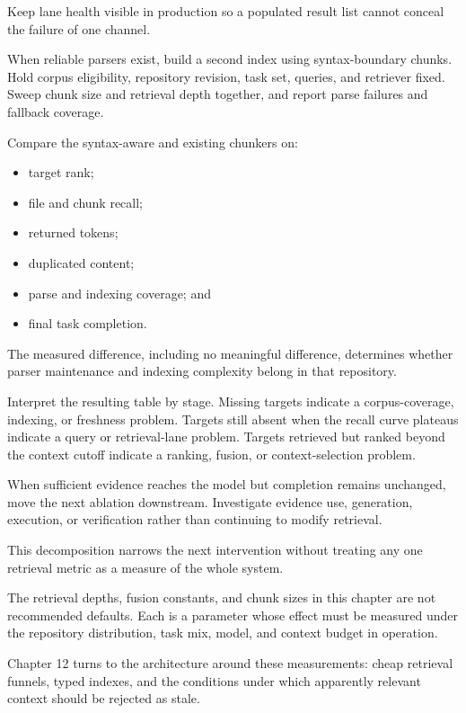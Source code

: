 Keep lane health visible in production so a populated result list cannot conceal the failure of one channel.

When reliable parsers exist, build a second index using syntax-boundary chunks. Hold corpus eligibility, repository revision, task set, queries, and retriever fixed. Sweep chunk size and retrieval depth together, and report parse failures and fallback coverage.

Compare the syntax-aware and existing chunkers on:

\begin{itemize}
\tightlist
\item
  target rank;
\item
  file and chunk recall;
\item
  returned tokens;
\item
  duplicated content;
\item
  parse and indexing coverage; and
\item
  final task completion.
\end{itemize}

The measured difference, including no meaningful difference, determines whether parser maintenance and indexing complexity belong in that repository.

Interpret the resulting table by stage. Missing targets indicate a corpus-coverage, indexing, or freshness problem. Targets still absent when the recall curve plateaus indicate a query or retrieval-lane problem. Targets retrieved but ranked beyond the context cutoff indicate a ranking, fusion, or context-selection problem.

When sufficient evidence reaches the model but completion remains unchanged, move the next ablation downstream. Investigate evidence use, generation, execution, or verification rather than continuing to modify retrieval.

This decomposition narrows the next intervention without treating any one retrieval metric as a measure of the whole system.

The retrieval depths, fusion constants, and chunk sizes in this chapter are not recommended defaults. Each is a parameter whose effect must be measured under the repository distribution, task mix, model, and context budget in operation.

Chapter 12 turns to the architecture around these measurements: cheap retrieval funnels, typed indexes, and the conditions under which apparently relevant context should be rejected as stale.


